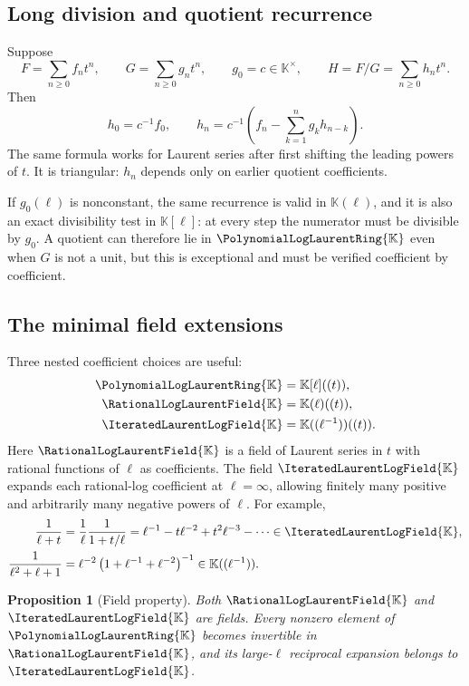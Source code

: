 \documentclass[11pt,oneside]{article}
\numberwithin{equation}{section}
\newtheorem{proposition}[theorem]{Proposition}
\theoremstyle{definition}
\newcommand{\K}{\mathbb{K}}
\newcommand{\PL}{\PolynomialLogLaurentRing{\K}}
\newcommand{\RL}{\RationalLogLaurentField{\K}}
\newcommand{\HL}{\IteratedLaurentLogField{\K}}
\begin{document}
\subsection{Long division and quotient recurrence}

Suppose
\[
 F=\sum_{n\ge0}f_n t^n,
 \qquad G=\sum_{n\ge0}g_n t^n,
 \qquad g_0=c\in\K^\times,
 \qquad H=F/G=\sum_{n\ge0}h_n t^n.
\]
Then
\begin{equation}\label{eq:quotient-recurrence}
  h_0=c^{-1}f_0,
  \qquad
  h_n=c^{-1}\left(f_n-\sum_{k=1}^{n}g_kh_{n-k}\right).
\end{equation}
The same formula works for Laurent series after first shifting the leading
powers of \(t\).  It is triangular: \(h_n\) depends only on earlier quotient
coefficients.

If \(g_0(\ell)\) is nonconstant, the same recurrence is valid in
\(\K(\ell)\), and it is also an exact divisibility test in \(\K[\ell]\): at every
step the numerator must be divisible by \(g_0\).  A quotient can therefore lie in
\(\PL\) even when \(G\) is not a unit, but this is exceptional and must be
verified coefficient by coefficient.

\subsection{The minimal field extensions}\label{subsec:field-extensions}

Three nested coefficient choices are useful:
\begin{align}
 \PL&=\K[\ell]((t)),\label{eq:ring-hierarchy-a}\\
 \RL&=\K(\ell)((t)),\label{eq:ring-hierarchy-b}\\
 \HL&=\K((\ell^{-1}))((t)).\label{eq:ring-hierarchy-c}
\end{align}
Here \(\RL\) is a field of Laurent series in \(t\) with rational functions of
\(\ell\) as coefficients.  The field \(\HL\) expands each rational-log
coefficient at \(\ell=\infty\), allowing finitely many positive and arbitrarily
many negative powers of \(\ell\).  For example,
\begin{align*}
  \frac{1}{\ell+t}
  &=\frac1\ell\frac{1}{1+t/\ell}
    =\ell^{-1}-t\ell^{-2}+t^2\ell^{-3}-\cdots\in\HL,\\
  \frac{1}{\ell^2+\ell+1}
  &=\ell^{-2}\left(1+\ell^{-1}+\ell^{-2}\right)^{-1}
    \in\K((\ell^{-1})).
\end{align*}

\begin{proposition}[Field property]
Both \(\RL\) and \(\HL\) are fields.  Every nonzero element of \(\PL\) becomes
invertible in \(\RL\), and its large-\(\ell\) reciprocal expansion belongs to
\(\HL\).
\end{proposition}
\end{document}
